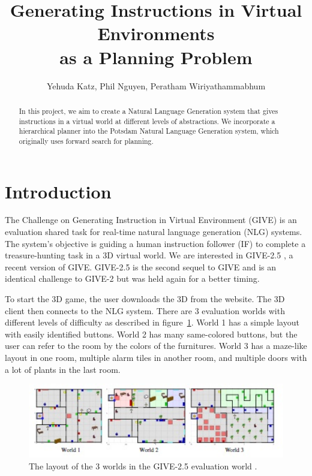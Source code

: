 \documentclass[11pt]{article} %
\title{Generating Instructions in Virtual Environments\\ as a Planning Problem}
\author{Yehuda Katz, Phil Nguyen, Peratham Wiriyathammabhum}
\begin{document}
\maketitle

\begin{abstract}
In this project, we aim to create a Natural Language Generation system
that gives instructions in a virtual world at different levels of abstractions.
We incorporate a hierarchical planner into the Potsdam Natural Language Generation system,
which originally uses forward search for planning.
\end{abstract}

\section{Introduction}
The Challenge on Generating Instruction in Virtual Environment (GIVE) \cite{koller2010first}
is an evaluation shared task for real-time natural language generation (NLG) systems.
The system's objective is guiding a human instruction follower (IF) to complete a treasure-hunting task
in a 3D virtual world.
We are interested in GIVE-2.5 \cite{striegnitz2011report}, a recent version of GIVE.
GIVE-2.5 is the second sequel to GIVE and is an identical challenge
to GIVE-2 \cite{koller2010report} but was held again for a better timing.

To start the 3D game, the user downloads the 3D from the website.
The 3D client then connects to the NLG system.
There are 3 evaluation worlds with different levels of difficulty as described in figure~\ref{fig:layout}.
World 1 has a simple layout with easily identified buttons.
World 2 has many same-colored buttons, but the user can refer
to the room by the colors of the furnitures.
World 3 has a maze-like layout in one room, multiple alarm tiles
in another room,
and multiple doors with a lot of plants in the last room.

\begin{figure}[hbt!]
\centering
\includegraphics[width=120mm]{images/layout.jpg}
\caption{The layout of the 3 worlds in the GIVE-2.5 evaluation world \cite{striegnitz2011report}.\label{overflow}}
\label{fig:layout}
\end{figure}
\end{document}
